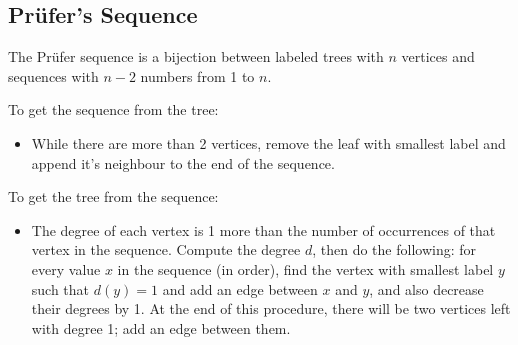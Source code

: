 \subsection{Prüfer's Sequence}
The Prüfer sequence is a bijection between labeled trees with $n$ vertices and sequences with $n-2$ numbers from 1 to $n$.

To get the sequence from the tree:

\begin{itemize}
    \item While there are more than 2 vertices, remove the leaf with smallest label and append it's neighbour to the end of the sequence.
\end{itemize}

To get the tree from the sequence:

\begin{itemize}
    \item The degree of each vertex is 1 more than the number of occurrences of that vertex in the sequence. Compute the degree $d$, then do the following: for every value $x$ in the sequence (in order), find the vertex with smallest label $y$ such that $d(y) = 1$ and add an edge between $x$ and $y$, and also decrease their degrees by 1. At the end of this procedure, there will be two vertices left with degree 1; add an edge between them.
\end{itemize}
